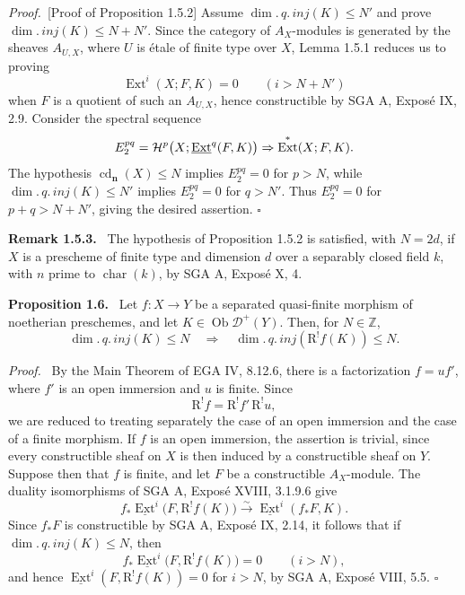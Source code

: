 \documentclass[11pt]{article}
\theoremstyle{plain}
\theoremstyle{definition}
\theoremstyle{remark}
\newenvironment{statement}[1]{\par\medskip\noindent\textbf{#1.}\ }{\par\medskip}
\newenvironment{prooftext}{\par\noindent\textit{Proof.}\ }{\par\medskip}
\newcommand{\ZZ}{\mathbb Z}
\newcommand{\D}{\mathcal D}\newcommand{\E}{\mathcal E}\newcommand{\F}{\mathcal F}
\DeclareMathOperator{\Ext}{Ext}
\DeclareMathOperator{\ob}{Ob}
\DeclareMathOperator{\cd}{cd}
\newcommand{\R}{\mathrm R}
\newcommand{\qedtext}{\hfill$\square$}
\begin{document}
\begin{prooftext}[Proof of Proposition 1.5.2]
Assume $\dim.\,q.\,inj(K)\le N'$ and prove $\dim.\,inj(K)\le N+N'$. Since the category of $A_X$-modules is generated by the sheaves $A_{U,X}$, where $U$ is étale of finite type over $X$, Lemma 1.5.1 reduces us to proving
\[
   \Ext^i(X;F,K)=0\qquad(i>N+N')
\]
when $F$ is a quotient of such an $A_{U,X}$, hence constructible by SGA A, Exposé IX, 2.9. Consider the spectral sequence
\[
   E_2^{pq}=\Hh^p\bigl(X;\underline{\Ext}^{q}(F,K)\bigr)\Rightarrow\Ext^*(X;F,K).
\]
The hypothesis $\cd_{\mathbf n}(X)\le N$ implies $E_2^{pq}=0$ for $p>N$, while $\dim.\,q.\,inj(K)\le N'$ implies $E_2^{pq}=0$ for $q>N'$. Thus $E_2^{pq}=0$ for $p+q>N+N'$, giving the desired assertion. \qedtext
\end{prooftext}

\begin{statement}{Remark 1.5.3}
The hypothesis of Proposition 1.5.2 is satisfied, with $N=2d$, if $X$ is a prescheme of finite type and dimension $d$ over a separably closed field $k$, with $n$ prime to $\operatorname{char}(k)$, by SGA A, Exposé X, 4.
\end{statement}

\begin{statement}{Proposition 1.6}
Let $f:X\to Y$ be a separated quasi-finite morphism of noetherian preschemes, and let $K\in\ob\D^+(Y)$. Then, for $N\in\ZZ$,
\[
   \dim.\,q.\,inj(K)\le N\quad\Longrightarrow\quad
   \dim.\,q.\,inj(\R^!f(K))\le N.
\]
\end{statement}

\begin{prooftext}
By the Main Theorem of EGA IV, 8.12.6, there is a factorization $f=uf'$, where $f'$ is an open immersion and $u$ is finite. Since
\[
   \R^!f=\R^!f'\,\R^!u,
\]
we are reduced to treating separately the case of an open immersion and the case of a finite morphism. If $f$ is an open immersion, the assertion is trivial, since every constructible sheaf on $X$ is then induced by a constructible sheaf on $Y$. Suppose then that $f$ is finite, and let $F$ be a constructible $A_X$-module. The duality isomorphisms of SGA A, Exposé XVIII, 3.1.9.6 give
\[
   f_*\underline{\Ext}^i\bigl(F,\R^!f(K)\bigr)\xrightarrow{\sim}\underline{\Ext}^{i}(f_*F,K).
\]
Since $f_*F$ is constructible by SGA A, Exposé IX, 2.14, it follows that if $\dim.\,q.\,inj(K)\le N$, then
\[
   f_*\underline{\Ext}^i\bigl(F,\R^!f(K)\bigr)=0\qquad(i>N),
\]
and hence $\underline{\Ext}^i(F,\R^!f(K))=0$ for $i>N$, by SGA A, Exposé VIII, 5.5. \qedtext
\end{prooftext}
\end{document}

